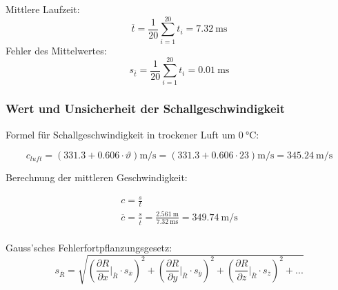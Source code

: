 Mittlere Laufzeit:
\begin{equation}
    \overline{t} = \frac{1}{20} \sum_{i=1}^{20} t_i = \SI{7.32}{\milli\second}
\end{equation}
Fehler des Mittelwertes:
\begin{equation}
    s_{\overline{t}} = \frac{1}{20} \sum_{i=1}^{20} t_i = \SI{0.01}{\milli\second}
\end{equation}

\subsubsection{Wert und Unsicherheit der Schallgeschwindigkeit}

Formel f\"ur Schallgeschwindigkeit in trockener Luft um $\SI{0}{\celsius}$:

\begin{equation}
    c_{luft} = (331.3 + 0.606 \cdot \vartheta) \si{\meter\per\second} = (331.3 + 0.606 \cdot 23) \si{\meter\per\second} = \SI{345.24}{\meter\per\second}
\end{equation}

Berechnung der mittleren Geschwindigkeit:

\begin{gather}
    c = \frac{s}{t} \\
    \overline{c} = \frac{s}{\overline{t}} = \frac{\SI{2.561}{\meter}}{\SI{7.32}{\milli\second}} = \SI{349.74}{\meter\per\second} \\
\end{gather}

Gauss'sches Fehlerfortpflanzungsgesetz:
\begin{equation}
    s_{\overline{R}} = \sqrt{ \left( \frac{\partial R}{\partial x} \biggr\rvert_{\overline{R}} \cdot s_{\overline{x}}\right)^2
                            + \left( \frac{\partial R}{\partial y} \biggr\rvert_{\overline{R}} \cdot s_{\overline{y}}\right)^2
                            + \left( \frac{\partial R}{\partial z} \biggr\rvert_{\overline{R}} \cdot s_{\overline{z}}\right)^2
                            + ... }
\end{equation}

